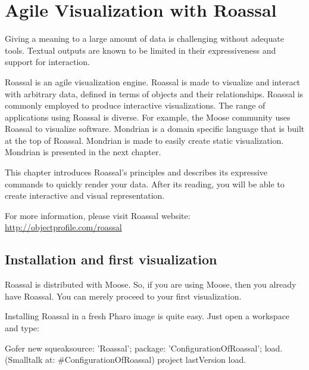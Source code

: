 \documentclass[a4paper,10pt,twoside]{book}
\begin{document}
\fi
\sloppy
\chapter{Agile Visualization with Roassal}




Giving a meaning to a large amount of data is challenging without adequate tools. Textual outputs are known to be limited in their expressiveness and support for interaction. 

Roassal is an agile visualization engine. Roassal is made to visualize and interact with arbitrary data, defined in terms of objects and their relationships. Roassal is commonly employed to produce interactive visualizations. The range of applications using Roassal is diverse. For example, the Moose community uses Roassal to visualize software. 
Mondrian is a domain specific language that is built at the top of Roassal. Mondrian is made to easily create static visualization. Mondrian is presented in the next chapter. 

This chapter introduces Roassal's principles and describes its expressive commands to quickly render your data. After its reading, you will be able to create interactive and visual representation. 

For more information, please visit Roassal website: \url{http://objectprofile.com/roassal}

\section{Installation and first visualization}
Roassal is distributed with Moose. So, if you are using Moose, then you already have Roassal. You can merely proceed to your first visualization.

Installing Roassal in a fresh Pharo image is quite easy. Just open a workspace and type:

\begin{code}{}
Gofer new
	squeaksource: 'Roassal'; 
	package: 'ConfigurationOfRoassal';
	load.
(Smalltalk at: #ConfigurationOfRoassal) project lastVersion load.
\end{code}
\end{document}
